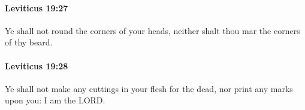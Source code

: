		\paragraph{Leviticus 19:27} %
			\label{LEVITICUS-19-27}

			Ye shall not round the corners of your heads, neither shalt thou mar the corners of thy beard.


		\paragraph{Leviticus 19:28} %
			\label{LEVITICUS-19-28}

			Ye shall not make any cuttings in your flesh for the dead, nor print any marks upon you: I am the LORD.


